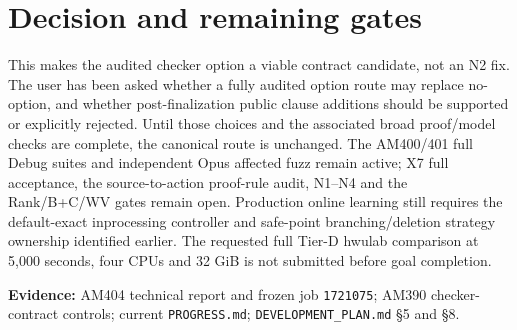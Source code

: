 \documentclass[11pt]{article}
\newcommand{\code}[1]{\texttt{#1}}
\begin{document}
\section*{Decision and remaining gates}
This makes the audited checker option a viable contract candidate, not an N2 fix. The user has been asked whether a fully audited option route may replace no-option, and whether post-finalization public clause additions should be supported or explicitly rejected. Until those choices and the associated broad proof/model checks are complete, the canonical route is unchanged. The AM400/401 full Debug suites and independent Opus affected fuzz remain active; X7 full acceptance, the source-to-action proof-rule audit, N1--N4 and the Rank/B+C/WV gates remain open. Production online learning still requires the default-exact inprocessing controller and safe-point branching/deletion strategy ownership identified earlier. The requested full Tier-D hwulab comparison at 5,000 seconds, four CPUs and 32 GiB is not submitted before goal completion.

\noindent\textbf{Evidence:} AM404 technical report and frozen job \code{1721075}; AM390 checker-contract controls; current \code{PROGRESS.md}; \code{DEVELOPMENT\_PLAN.md} \S5 and \S8.
\end{document}
